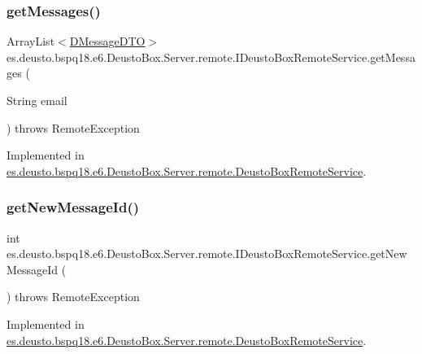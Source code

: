\subsubsection{\texorpdfstring{get\+Messages()}{getMessages()}}
{\footnotesize\ttfamily Array\+List$<$\mbox{\hyperlink{classes_1_1deusto_1_1bspq18_1_1e6_1_1_deusto_box_1_1_server_1_1dto_1_1_d_message_d_t_o}{D\+Message\+D\+TO}}$>$ es.\+deusto.\+bspq18.\+e6.\+Deusto\+Box.\+Server.\+remote.\+I\+Deusto\+Box\+Remote\+Service.\+get\+Messages (\begin{DoxyParamCaption}\item[{String}]{email }\end{DoxyParamCaption}) throws Remote\+Exception}



Implemented in \mbox{\hyperlink{classes_1_1deusto_1_1bspq18_1_1e6_1_1_deusto_box_1_1_server_1_1remote_1_1_deusto_box_remote_service_ad01c937c994fae0630402d05bc99496a}{es.\+deusto.\+bspq18.\+e6.\+Deusto\+Box.\+Server.\+remote.\+Deusto\+Box\+Remote\+Service}}.

\mbox{\label{interfacees_1_1deusto_1_1bspq18_1_1e6_1_1_deusto_box_1_1_server_1_1remote_1_1_i_deusto_box_remote_service_afa1bd951be454101604c8a2019da59f8}} 
\subsubsection{\texorpdfstring{get\+New\+Message\+Id()}{getNewMessageId()}}
{\footnotesize\ttfamily int es.\+deusto.\+bspq18.\+e6.\+Deusto\+Box.\+Server.\+remote.\+I\+Deusto\+Box\+Remote\+Service.\+get\+New\+Message\+Id (\begin{DoxyParamCaption}{ }\end{DoxyParamCaption}) throws Remote\+Exception}



Implemented in \mbox{\hyperlink{classes_1_1deusto_1_1bspq18_1_1e6_1_1_deusto_box_1_1_server_1_1remote_1_1_deusto_box_remote_service_ae5002c8513876aae8e9e098e97819696}{es.\+deusto.\+bspq18.\+e6.\+Deusto\+Box.\+Server.\+remote.\+Deusto\+Box\+Remote\+Service}}.

